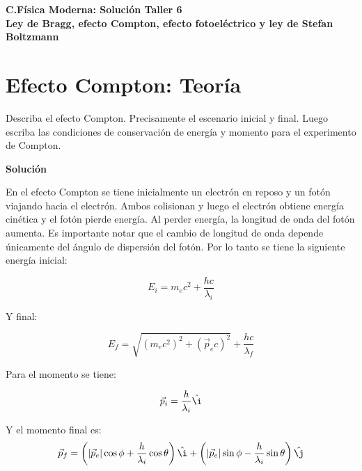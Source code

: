 \documentclass[12pt]{article}
\begin{document}
 
\begin{center}
\Large \textbf{C.Física Moderna: Solución Taller 6}\\
\normalsize \textbf{Ley de Bragg, efecto Compton, efecto fotoeléctrico y ley de Stefan Boltzmann }
\end{center}
 
  

\section{Efecto Compton: Teoría }

Describa el efecto Compton. Precisamente el escenario inicial y final. Luego
escriba las condiciones de conservación de energía y momento para el
experimento de Compton.



\begin{center}
	\textbf{Solución}
\end{center}


En el efecto Compton se tiene inicialmente un electrón en reposo y un fotón viajando hacia el electrón. Ambos colisionan y luego el electrón obtiene energía cinética y el fotón pierde energía. Al perder energía, la longitud de onda del fotón aumenta. Es importante notar que el cambio de longitud de onda depende únicamente del ángulo de dispersión del fotón.
Por lo tanto se tiene la siguiente energía inicial:

\begin{equation*}
E_i = m_e c^2 + \frac{h c}{\lambda_i}
\end{equation*}

Y final:

\begin{equation*}
E_f = \sqrt{(m_ec^2)^2 + (\vec{p}_e c)^2}+\frac{h c}{\lambda_f}
\end{equation*}

Para el momento se tiene:

\begin{equation*}
\vec{p}_i = \frac{h}{\lambda_i}\hat{\i}
\end{equation*}

Y el momento final es:
\begin{equation*}
\vec{p}_f = \left(  |\vec{p}_e| \cos \phi +\frac{h}{\lambda_i} \cos\theta\right)\hat{
	\i} + \left(  |\vec{p}_e| \sin \phi -\frac{h}{\lambda_i} \sin\theta\right)\hat{\j} 
\end{equation*}
\end{document}
